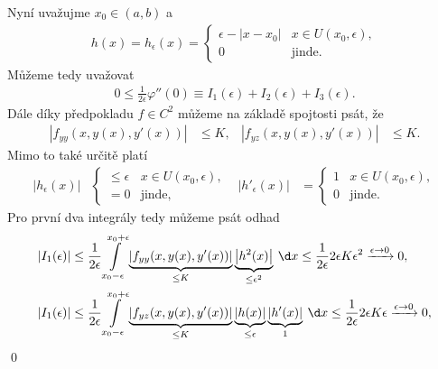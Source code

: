 \documentclass[11pt,a4paper]{article}
\theoremstyle{theorem}
\renewenvironment{proof}[1][\proofname]{{\bfseries #1.\quad}}{\qed}
\theoremstyle{remark}
\theoremstyle{definition}
\begin{document}
\begin{proof}
            Nyní uvažujme $x_0 \in (a,b)$ a
            \begin{align*}
                h(x) = h_\epsilon(x) = \begin{cases}
                    \epsilon - |x-x_0| & x \in U(x_0,\epsilon),
                \\
                    0 & \text{jinde}.
                \end{cases}
            \end{align*}
            Můžeme tedy uvažovat
            \begin{align*}
                0 \leq \frac{1}{2\epsilon} \varphi''(0) \equiv I_1(\epsilon) + I_2(\epsilon) + I_3(\epsilon).
            \end{align*}
            Dále díky předpokladu $f \in C^2$ můžeme na základě spojtosti psát, že
            \begin{align*}
                |f_{yy}(x,y(x),y'(x))| &\leq K,
            &
                |f_{yz}(x,y(x),y'(x))| &\leq K.
            \end{align*}
            Mimo to také určitě platí
            \begin{align*}
                |h_\epsilon(x)| &\begin{cases}
                    \leq \epsilon & x \in U(x_0,\epsilon),
                \\
                    =0 & \text{jinde},
                \end{cases}
            &
                |h'_\epsilon(x)| &= \begin{cases}
                    1 & x \in U(x_0,\epsilon),
                \\
                    0 & \text{jinde}.
                \end{cases}
            \end{align*}
            Pro první dva integrály tedy můžeme psát odhad
            \begin{align*}
                |I_1(\epsilon)| &\leq \frac{1}{2\epsilon} \int\limits_{x_0-\epsilon}^{x_0+\epsilon} \underbrace{|f_{yy}(x,y(x),y'(x))|}_{\leq K} \underbrace{\left| h^2(x) \right|}_{\leq \epsilon^2} \: \d x \leq \frac{1}{2\epsilon} 2\epsilon K\epsilon^2 \xrightarrow{\epsilon \to 0} 0,
            \\
                |I_1(\epsilon)| &\leq \frac{1}{2\epsilon} \int\limits_{x_0-\epsilon}^{x_0+\epsilon} \underbrace{|f_{yz}(x,y(x),y'(x))|}_{\leq K} \underbrace{|h(x)|}_{\leq \epsilon} \underbrace{|h'(x)|}_{1} \: \d x \leq \frac{1}{2\epsilon} 2\epsilon K\epsilon \xrightarrow{\epsilon \to 0} 0,

\end{align*}
\end{proof}
\end{document}
